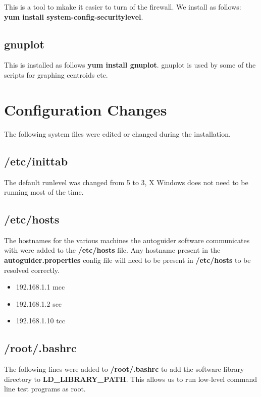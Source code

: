 \documentclass[10pt,a4paper]{article}
\begin{document}
This is a tool to mkake it easier to turn of the firewall. We install as follows:
 {\bf yum install system-config-securitylevel}.

\subsection{gnuplot}

This is installed as follows {\bf yum install gnuplot}. gnuplot is used by some of the scripts
for graphing centroids etc.

\section{Configuration Changes}

The following system files were edited or changed during the installation.

\subsection{/etc/inittab}

The default runlevel was changed from 5 to 3, X Windows does not need to be running most of the time.

\subsection{/etc/hosts}

The hostnames for the various machines the autoguider software communicates with were added to the {\bf /etc/hosts} file. Any hostname present in the {\bf autoguider.properties} config file will need to be present in {\bf /etc/hosts} to be resolved correctly.

\begin{itemize}
\item 192.168.1.1     mcc
\item 192.168.1.2     scc
\item 192.168.1.10    tcc
\end{itemize}

\subsection{/root/.bashrc}

The following lines were added to {\bf /root/.bashrc} to add the software library directory to
{\bf LD\_LIBRARY\_PATH}. This allows us to run low-level command line test programs as root.
\end{document}
